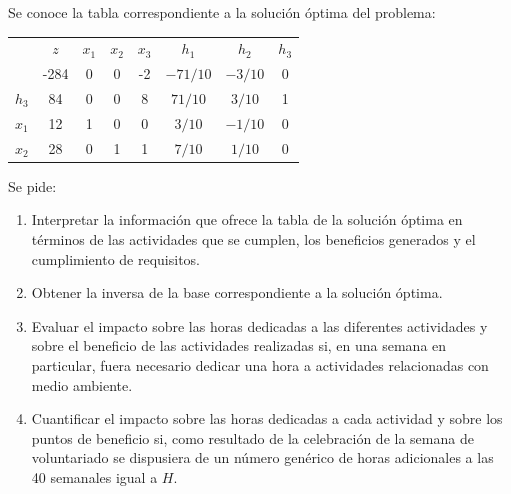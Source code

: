 Se conoce la tabla correspondiente a la solución óptima del problema:

\begin{center}
\begin{tabular}{c|c|cccccc|}
 & $z$ & $x_1$ & $x_2$ & $x_3$ & $h_1$ & $h_2$ & $h_3$\\ 
      & -284 & 0 & 0 & -2 & $-71/10$ & $-3/10$ & 0 \\ 
\hline
$h_3$ & 84  & 0 & 0 & 8 & $71/10$ & $3/10$ & 1\\ 
$x_1$ & 12  & 1 & 0 & 0 & $3/10$ & $-1/10$ & 0\\ 
$x_2$ & 28  & 0 & 1 & 1 & $7/10$ & $1/10$ & 0\\ 
\hline
\end{tabular}
\end{center}

Se pide:

\begin{enumerate}
    \item Interpretar la información que ofrece la tabla de la solución óptima en términos de las actividades que se cumplen, los beneficios generados y el cumplimiento de requisitos.

    \item Obtener la inversa de la base correspondiente a la solución óptima.

    \item Evaluar el impacto sobre las horas dedicadas a las diferentes actividades y sobre el beneficio de las actividades realizadas si, en una semana en particular, fuera necesario dedicar una hora a actividades relacionadas con medio ambiente.

    \item Cuantificar el impacto sobre las horas dedicadas a cada actividad y sobre los puntos de beneficio si, como resultado de la celebración de la semana de voluntariado se dispusiera de un número genérico de horas adicionales a las 40 semanales igual a $H$.
    
\end{enumerate}





